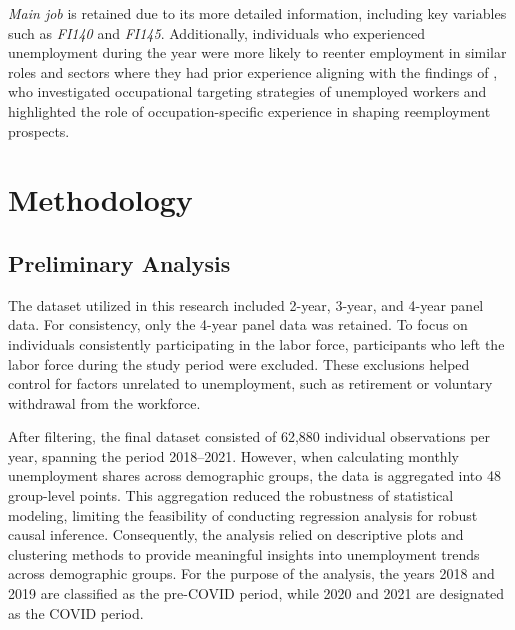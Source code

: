 \documentclass[a4paper,12pt]{article}
\begin{document}
\textit{Main job} is retained due to its more detailed information, including key variables such as \textit{FI140} and \textit{FI145}. Additionally, individuals who experienced unemployment during the year were more likely to reenter employment in similar roles and sectors where they had prior experience aligning with the findings of \cite{IZA-DP16696}, who investigated occupational targeting strategies of unemployed workers and highlighted the role of occupation-specific experience in shaping reemployment prospects.





\section{Methodology}

\subsection{Preliminary Analysis}

The dataset utilized in this research included 2-year, 3-year, and 4-year panel data. For consistency, only the 4-year panel data was retained. To focus on individuals consistently participating in the labor force, participants who left the labor force during the study period were excluded. These exclusions helped control for factors unrelated to unemployment, such as retirement or voluntary withdrawal from the workforce.

After filtering, the final dataset consisted of 62,880 individual observations per year, spanning the period 2018--2021. However, when calculating monthly unemployment shares across demographic groups, the data is aggregated into 48 group-level points. This aggregation reduced the robustness of statistical modeling, limiting the feasibility of conducting regression analysis for robust causal inference. Consequently, the analysis relied on descriptive plots and clustering methods to provide meaningful insights into unemployment trends across demographic groups. For the purpose of the analysis, the years 2018 and 2019 are classified as the pre-COVID period, while 2020 and 2021 are designated as the COVID period.
\end{document}
